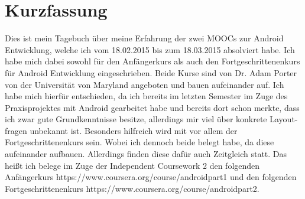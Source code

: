 \documentclass[12pt,a4paper,bibliography=totocnumbered,listof=totocnumbered]{scrartcl}
\begin{document}
\setcounter{page}{1}
\onehalfspacing
{}
\section{Kurzfassung}
Dies ist mein Tagebuch über meine Erfahrung der zwei MOOCs zur Android Entwicklung, welche ich vom 18.02.2015 bis zum 18.03.2015 absolviert habe. \newline
Ich habe mich dabei sowohl für den Anfängerkurs als auch den Fortgeschrittenenkurs für Android Entwicklung eingeschrieben.    
Beide Kurse sind von Dr. Adam Porter von der Universität von Maryland angeboten und bauen aufeinander auf.\newline
Ich habe mich hierfür entschieden, da ich bereits im letzten Semester im Zuge des Praxisprojektes mit Android gearbeitet habe und bereits dort schon merkte, dass ich zwar gute Grundkenntnisse besitze, allerdings mir viel über konkrete Layout-fragen unbekannt ist. Besonders hilfreich wird mit vor allem der Fortgeschrittenenkurs sein. Wobei ich dennoch beide belegt habe, da diese aufeinander aufbauen. Allerdings finden diese dafür auch Zeitgleich statt.\newline
Das heißt ich belege im Zuge der Independent Coursework 2 den folgenden Anfängerkurs \textcolor[rgb]{0,0,1}{https://www.coursera.org/course/androidpart1} und den folgenden Fortgeschrittenenkurs \textcolor[rgb]{0,0,1}{https://www.coursera.org/course/androidpart2}.

\pagebreak

\renewcommand{\cfttabpresnum}{Tab. }
\renewcommand{\cftfigpresnum}{Abb. }
\settowidth{\cfttabnumwidth}{Abb. 10\quad}
\settowidth{\cftfignumwidth}{Abb. 10\quad}

\singlespacing
{}
\renewcommand{\contentsname}{II Inhaltsverzeichnis}
{}
\addtocounter{section}{1}
\tableofcontents
\pagebreak
{}
\listoffigures
\pagebreak
\end{document}
